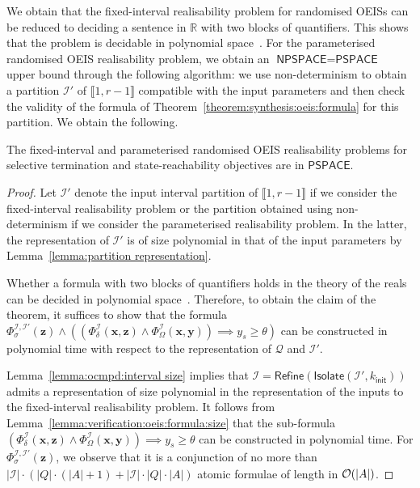 \documentclass[a4paper,UKenglish,cleveref,autoref,thm-restate,colorlinks]{lipics-v2021}
\newcommand{\init}{\mathsf{init}}
\newcommand{\integerInterval}[1]{\llbracket{}#1\rrbracket{}}
\newcommand{\pspace}{\textsf{PSPACE}}
\newcommand{\npspace}{\textsf{NPSPACE}}
\newcommand{\IR}{\mathbb{R}}
\newcommand{\ocmdp}{\mathcal{Q}}
\newcommand{\ocStateSpace}{Q}
\newcommand{\ocCount}{k}
\newcommand{\ocConfig}{s}
\newcommand{\ocActionSpace}{A}
\newcommand{\ocTrans}{\delta}
\newcommand{\counterUB}{r}
\newcommand{\intPart}{\mathcal{I}}
\newcommand{\varTrans}{x}
\newcommand{\varTransTuple}{\mathbf{\varTrans}}
\newcommand{\varObj}{y}
\newcommand{\varObjTuple}{\mathbf{\varObj}}
\newcommand{\varStrat}{z}
\newcommand{\varStratTuple}{\mathbf{\varStrat}}
\newcommand{\formulaTransBase}{\Phi_{\ocTrans}}
\newcommand{\formulaObjBase}{\Phi_{\objective}}
\newcommand{\formulaStratBase}{\Phi_{\strat}}
\newcommand{\formulaTrans}{\formulaTransBase^\intPart}
\newcommand{\formulaObj}{\formulaObjBase^\intPart}
\newcommand{\formulaStrat}{\formulaStratBase^{\intPart,\intPart'}}
\newcommand{\objective}{\Omega}
\newcommand{\thresProba}{\theta}
\newcommand{\stratGeneric}[1]{{\sigma_{#1}}}
\newcommand{\strat}{\stratGeneric{}}
\begin{document}
We obtain that the fixed-interval realisability problem for randomised OEISs can be reduced to deciding a sentence in $\IR$ with two blocks of quantifiers.
This shows that the problem is decidable in polynomial space~\cite[Rmk.~13.10]{BPR2006}.
For the parameterised randomised OEIS realisability problem, we obtain an $\npspace = \pspace$~\cite{DBLP:journals/jcss/Savitch70} upper bound through the following algorithm: we use non-determinism to obtain a partition $\intPart'$ of $\integerInterval{1, \counterUB-1}$ compatible with the input parameters and then check the validity of the formula of Theorem~\ref{theorem:synthesis:oeis:formula} for this partition.
We obtain the following.
\begin{theorem}\label{theorem:realisability:oeis:randomised}
  The fixed-interval and parameterised randomised OEIS realisability problems for selective termination and state-reachability objectives are in $\pspace$.
\end{theorem}
\begin{proof}
  Let $\intPart'$ denote the input interval partition of $\integerInterval{1, \counterUB-1}$ if we consider the fixed-interval realisability problem or the partition obtained using non-determinism if we consider the parameterised realisability problem.
  In the latter, the representation of $\intPart'$ is of size polynomial in that of the input parameters by Lemma~\ref{lemma:partition representation}.

  Whether a formula with two blocks of quantifiers holds in the theory of the reals can be decided in polynomial space~\cite[Rmk.~13.10]{BPR2006}.
  Therefore, to obtain the claim of the theorem, it suffices to show that the formula $\formulaStrat(\varStratTuple)\land((\formulaTrans(\varTransTuple,\varStratTuple)\land\formulaObj(\varTransTuple, \varObjTuple))\implies \varObj_\ocConfig\geq\thresProba)$ can be constructed in polynomial time with respect to the representation of $\ocmdp$ and $\intPart'$.

  Lemma~\ref{lemma:ocmpd:interval size} implies that $\intPart=\mathsf{Refine}(\mathsf{Isolate}(\intPart', \ocCount_\init))$ admits a representation of size polynomial in the representation of the inputs to the fixed-interval realisability problem.
  It follows from Lemma~\ref{lemma:verification:oeis:formula:size} that the sub-formula $(\formulaTrans(\varTransTuple,\varStratTuple)\land\formulaObj(\varTransTuple, \varObjTuple))\implies \varObj_\ocConfig\geq\thresProba$ can be constructed in polynomial time.
  For $\formulaStrat(\varStratTuple)$, we observe that it is a conjunction of no more than $|\intPart|\cdot(|\ocStateSpace|\cdot(|\ocActionSpace|+1) + |\intPart|\cdot|\ocStateSpace|\cdot|\ocActionSpace|)$ atomic formulae of length in $\bigo(|\ocActionSpace|)$.
\end{proof}
\end{document}
